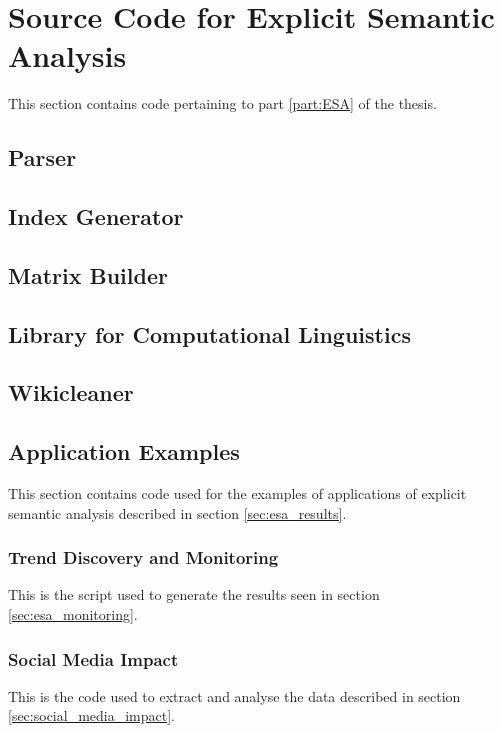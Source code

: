 \section{Source Code for Explicit Semantic Analysis}
This section contains code pertaining to part \ref{part:ESA} of the thesis.
\subsection{Parser}
\label{sec:xml_parse.py}
\newpage

\subsection{Index Generator}
\label{sec:generate_indices.py}
\newpage

\subsection{Matrix Builder}
\label{sec:matrix_builder.py}
\newpage

\subsection{Library for Computational Linguistics}
\label{sec:cunning_linguistics.py}

\subsection{Wikicleaner}
\label{sec:wikicleaner.py}

\subsection{Application Examples}
\label{sec:esa_examples}
This section contains code used for the examples of applications of explicit semantic analysis described in section \ref{sec:esa_results}.

\subsubsection{Trend Discovery and Monitoring}
This is the script used to generate the results seen in section \ref{sec:esa_monitoring}.

\subsubsection{Social Media Impact}
This is the code used to extract and analyse the data described in section \ref{sec:social_media_impact}.

